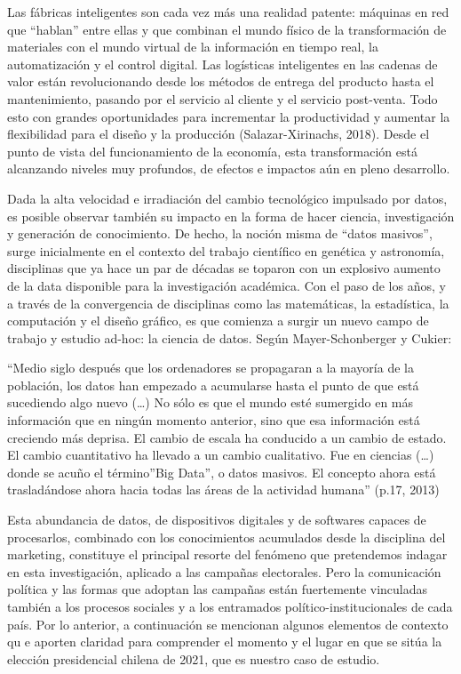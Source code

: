 \documentclass[
  10pt,
  letterpaper,
]{report}
\begin{document}
Las fábricas inteligentes son cada vez más una realidad patente:
máquinas en red que ``hablan'' entre ellas y que combinan el mundo
físico de la transformación de materiales con el mundo virtual de la
información en tiempo real, la automatización y el control digital. Las
logísticas inteligentes en las cadenas de valor están revolucionando
desde los métodos de entrega del producto hasta el mantenimiento,
pasando por el servicio al cliente y el servicio post-venta. Todo esto
con grandes oportunidades para incrementar la productividad y aumentar
la flexibilidad para el diseño y la producción (Salazar-Xirinachs,
2018). Desde el punto de vista del funcionamiento de la economía, esta
transformación está alcanzando niveles muy profundos, de efectos e
impactos aún en pleno desarrollo.

Dada la alta velocidad e irradiación del cambio tecnológico impulsado
por datos, es posible observar también su impacto en la forma de hacer
ciencia, investigación y generación de conocimiento. De hecho, la noción
misma de ``datos masivos'', surge inicialmente en el contexto del
trabajo científico en genética y astronomía, disciplinas que ya hace un
par de décadas se toparon con un explosivo aumento de la data disponible
para la investigación académica. Con el paso de los años, y a través de
la convergencia de disciplinas como las matemáticas, la estadística, la
computación y el diseño gráfico, es que comienza a surgir un nuevo campo
de trabajo y estudio ad-hoc: la ciencia de datos. Según
Mayer-Schonberger y Cukier:

``Medio siglo después que los ordenadores se propagaran a la mayoría de
la población, los datos han empezado a acumularse hasta el punto de que
está sucediendo algo nuevo (\ldots) No sólo es que el mundo esté
sumergido en más información que en ningún momento anterior, sino que
esa información está creciendo más deprisa. El cambio de escala ha
conducido a un cambio de estado. El cambio cuantitativo ha llevado a un
cambio cualitativo. Fue en ciencias (\ldots) donde se acuño el
término''Big Data'', o datos masivos. El concepto ahora está
trasladándose ahora hacia todas las áreas de la actividad humana''
(p.17, 2013)

Esta abundancia de datos, de dispositivos digitales y de softwares
capaces de procesarlos, combinado con los conocimientos acumulados desde
la disciplina del marketing, constituye el principal resorte del
fenómeno que pretendemos indagar en esta investigación, aplicado a las
campañas electorales. Pero la comunicación política y las formas que
adoptan las campañas están fuertemente vinculadas también a los procesos
sociales y a los entramados político-institucionales de cada país. Por
lo anterior, a continuación se mencionan algunos elementos de contexto
qu e aporten claridad para comprender el momento y el lugar en que se
sitúa la elección presidencial chilena de 2021, que es nuestro caso de
estudio.
\end{document}
